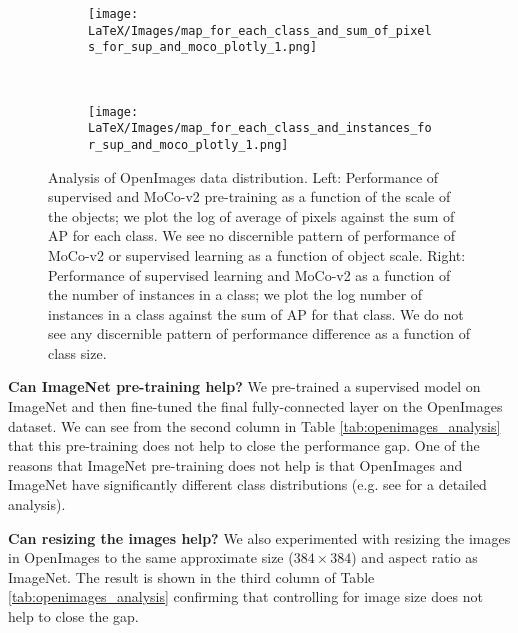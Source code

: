 \begin{figure*}[t!]
  \centering
  \begin{subfigure}[t]{0.48\textwidth}
   \centering
    \texttt{[image: LaTeX/Images/map\_for\_each\_class\_and\_sum\_of\_pixels\_for\_sup\_and\_moco\_plotly\_1.png]}
   
     \label{fig:scale_issue}
  \end{subfigure} 
  ~
  \begin{subfigure}[t]{0.48\linewidth}
   \centering
    \texttt{[image: LaTeX/Images/map\_for\_each\_class\_and\_instances\_for\_sup\_and\_moco\_plotly\_1.png]}
  \label{fig:long_tail_issue}
  \end{subfigure}
  \vspace{-0.3in}
    \caption{Analysis of OpenImages data distribution. Left: Performance of supervised and MoCo-v2 pre-training as a function of the scale of the objects; we plot the log of average of pixels against the sum of AP for each class. We see no discernible pattern of performance of MoCo-v2 or supervised learning as a function of object scale. Right: Performance of supervised learning and MoCo-v2 as a function of the number of instances in a class; we plot the log number of instances in a class against the sum of AP for that class. We do not see any discernible pattern of performance difference as a function of class size. \vspace{-10pt}}
\label{fig:issue_scale_long_tail}
\end{figure*}
\textbf{Can ImageNet pre-training help?}
 We pre-trained a supervised model on ImageNet and then fine-tuned the final fully-connected layer on the OpenImages dataset. We can see from the second column in Table  \ref{tab:openimages_analysis} that this pre-training does not help to close the performance gap. One of the reasons that ImageNet pre-training does not help is that OpenImages and ImageNet have significantly different class distributions (e.g. see \cite{li2019analysis} for a detailed analysis). %
 
\textbf{Can resizing the images help?}
We also experimented with resizing the images in OpenImages to the same approximate size ($384 \times 384$) and aspect ratio as ImageNet. The result is shown in the third column of Table \ref{tab:openimages_analysis} confirming that controlling for image size does not help to close the gap. 

